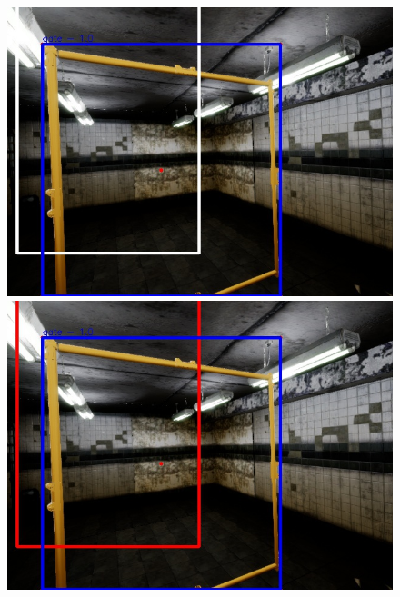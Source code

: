 \documentclass{article}
\begin{document}
\begin{figure}[htbp]
\begin{minipage}{0.3\linewidth}
	\end{minipage}
	
	\begin{minipage}{0.3\linewidth}
		\includegraphics[width=\linewidth]{0021-04.jpg}
	\end{minipage}
	\hfill
	\begin{minipage}{0.3\linewidth}
		\includegraphics[width=\linewidth]{0021-06.jpg}
	\end{minipage}
	\hfill
	\begin{minipage}{0.3\linewidth}

\end{minipage}
\end{figure}
\end{document}
